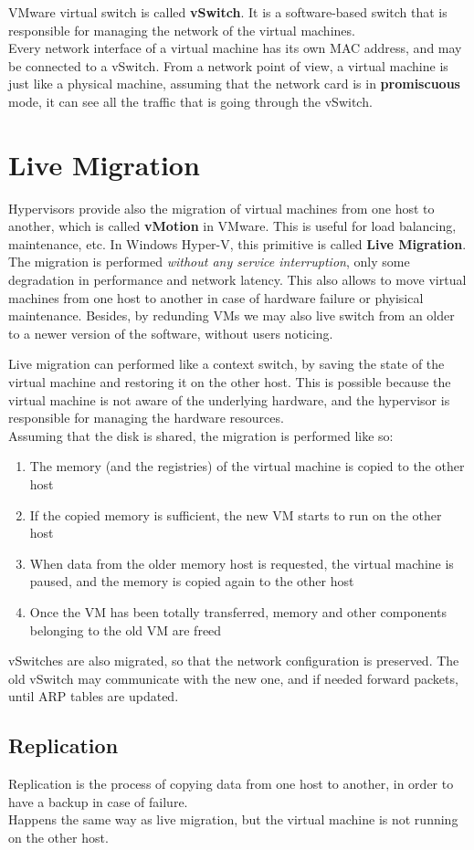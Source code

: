 VMware virtual switch is called \textbf{vSwitch}. It is a software-based switch that is responsible for managing the network of the virtual machines.\\
Every network interface of a virtual machine has its own MAC address, and may be connected to a vSwitch.
From a network point of view, a virtual machine is just like a physical machine, assuming that the network card is in \textbf{promiscuous} mode, it can see all the traffic that is going through the vSwitch.

\section{Live Migration}
Hypervisors provide also the migration of virtual machines from one host to another, which is called \textbf{vMotion} in VMware. This is useful for load balancing, maintenance, etc. In Windows Hyper-V, this primitive is called \textbf{Live Migration}.\\
The migration is performed \textit{without any service interruption}, only some degradation in performance and network latency.
This also allows to move virtual machines from one host to another in case of hardware failure or phyisical maintenance.
Besides, by redunding VMs we may also live switch from an older to a newer version of the software, without users noticing.

Live migration can performed like a context switch, by saving the state of the virtual machine and restoring it on the other host. This is possible because the virtual machine is not aware of the underlying hardware, and the hypervisor is responsible for managing the hardware resources.\\
Assuming that the disk is shared, the migration is performed like so:
\begin{enumerate}
   \item The memory (and the registries) of the virtual machine is copied to the other host
   \item If the copied memory is sufficient, the new VM starts to run on the other host
   \item When data from the older memory host is requested, the virtual machine is paused, and the memory is copied again to the other host
   \item Once the VM has been totally transferred, memory and other components belonging to the old VM are freed
\end{enumerate}

vSwitches are also migrated, so that the network configuration is preserved. The old vSwitch may communicate with the new one, and if needed forward packets, until ARP tables are updated.

\subsection{Replication}
Replication is the process of copying data from one host to another, in order to have a backup in case of failure.\\
Happens the same way as live migration, but the virtual machine is not running on the other host.